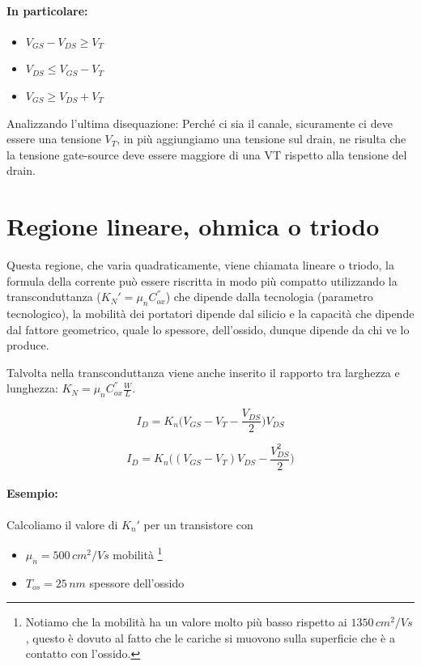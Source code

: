 \paragraph{In particolare:}
\begin{itemize}
    \item $V_{GS} - V_{DS} \geq V_T$
    \item $V_{DS} \leq V_{GS} - V_T$
    \item $V_{GS} \geq V_{DS} + V_T$
\end{itemize}

Analizzando l'ultima disequazione: Perché  ci sia il canale, sicuramente ci deve essere una tensione $V_T$, in più aggiungiamo una tensione sul drain, ne risulta che la tensione gate-source deve essere maggiore di una VT rispetto alla tensione del drain.


\newpage
\section{Regione	lineare, ohmica	o	triodo}
Questa regione, che varia quadraticamente, viene chiamata lineare o triodo, la formula della corrente può essere riscritta in modo più compatto utilizzando la transconduttanza  ($K_N' = \mu_nC_{ox}^{''}$) che dipende dalla tecnologia (parametro tecnologico), la mobilità dei portatori dipende dal silicio e la capacità che dipende dal fattore geometrico, quale lo spessore, dell'ossido, dunque dipende da chi ve lo produce.

Talvolta nella transconduttanza viene anche inserito il rapporto tra larghezza e lunghezza: $K_N = \mu_nC_{ox}^{''}\frac{W}{L}$.

\begin{equation*}
    I_D = K_n\biggl(V_{GS}-V_T-\frac{V_{DS}}{2}\biggl)V_{DS}
\end{equation*}

\begin{equation}
    I_D = K_n\biggl((V_{GS}-V_T)V_{DS}-\frac{V_{DS}^2}{2}\biggl)
    \label{corrente_drain_formula}
\end{equation}


\paragraph{Esempio:} Calcoliamo il valore di $K_n'$ per un transistore con
\begin{itemize}
    \item $\mu_n = 500\,cm^2/Vs$ mobilità \footnote{Notiamo che la mobilità ha un valore molto più basso rispetto ai $1350\,cm^2/Vs$, questo è dovuto al fatto che le cariche si muovono sulla superficie che è a contatto con l'ossido.}
    \item $T_{os} = 25\,nm$ spessore dell'ossido 
\end{itemize}

